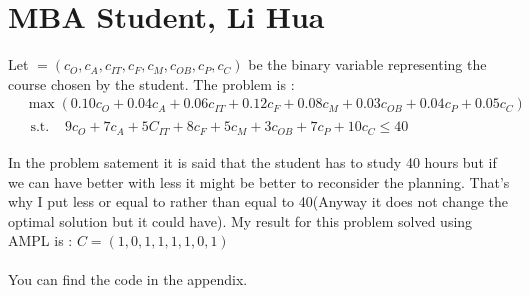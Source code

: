 \documentclass{article}
\begin{document}
\section*{MBA Student, Li Hua}
Let $ = (c_O,c_A,c_{IT},c_F,c_M,c_{OB},c_{P},c_C)$ be the binary variable representing the course chosen by the student.
The problem is :
\begin{equation}
    \boxed{
    \begin{split}
        &\max(0.10c_O+0.04c_A+0.06c_{IT}+0.12c_F+0.08c_M+0.03c_{OB}+0.04c_P+0.05c_C)\\
        &\begin{split}
            \text{s.t. }& 9c_O+7c_A+5C_{IT}+8c_F+5c_M+3c_{OB}+7c_P+10c_C\leq 40\\
        \end{split}\\
    \end{split}}
\end{equation}
In the problem satement it is said that the student has to study 40 hours but if we can have better with less it might be better to reconsider the planning. That's why I put less or equal to rather than equal to 40(Anyway it does not change the optimal solution but it could have).
My result for this problem solved using AMPL is : $C = (1,0,1,1,1,1,0,1)$
\\\\
You can find the code in the appendix. 
\newpage
\end{document}
